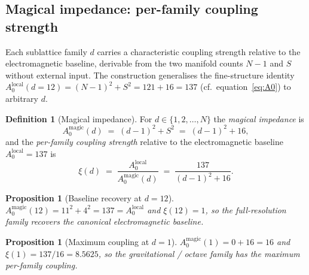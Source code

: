 \documentclass[11pt,a4paper]{article}
\newtheorem{proposition}[theorem]{Proposition}
\theoremstyle{definition}
\newtheorem{definition}[theorem]{Definition}
\theoremstyle{remark}
\begin{document}
\subsection{Magical impedance: per-family coupling strength}\label{subsec:impedance}

Each sublattice family $d$ carries a characteristic coupling strength relative to the electromagnetic baseline, derivable from the two manifold counts $N{-}1$ and $S$ without external input. The construction generalises the fine-structure identity $A_{0}^{\text{local}}(d{=}12) = (N{-}1)^{2}+S^{2} = 121+16 = 137$ (cf.\ equation~\eqref{eq:A0}) to arbitrary $d$.

\begin{definition}[Magical impedance]\label{def:magical-impedance}
For $d\in\{1,2,\ldots,N\}$ the \emph{magical impedance} is
\[
A_{0}^{\text{magic}}(d) \;=\; (d-1)^{2} + S^{2} \;=\; (d-1)^{2} + 16,
\]
and the \emph{per-family coupling strength} relative to the electromagnetic baseline $A_{0}^{\text{local}} = 137$ is
\[
\xi(d) \;=\; \frac{A_{0}^{\text{local}}}{A_{0}^{\text{magic}}(d)} \;=\; \frac{137}{(d-1)^{2}+16}.
\]
\end{definition}

\begin{proposition}[Baseline recovery at $d=12$]\label{prop:baseline}
$A_{0}^{\text{magic}}(12) = 11^{2}+4^{2} = 137 = A_{0}^{\text{local}}$ and $\xi(12) = 1$, so the full-resolution family recovers the canonical electromagnetic baseline.
\end{proposition}

\begin{proposition}[Maximum coupling at $d=1$]\label{prop:max-coupling}
$A_{0}^{\text{magic}}(1) = 0 + 16 = 16$ and $\xi(1) = 137/16 = 8.5625$, so the gravitational / octave family has the maximum per-family coupling.
\end{proposition}
\end{document}
